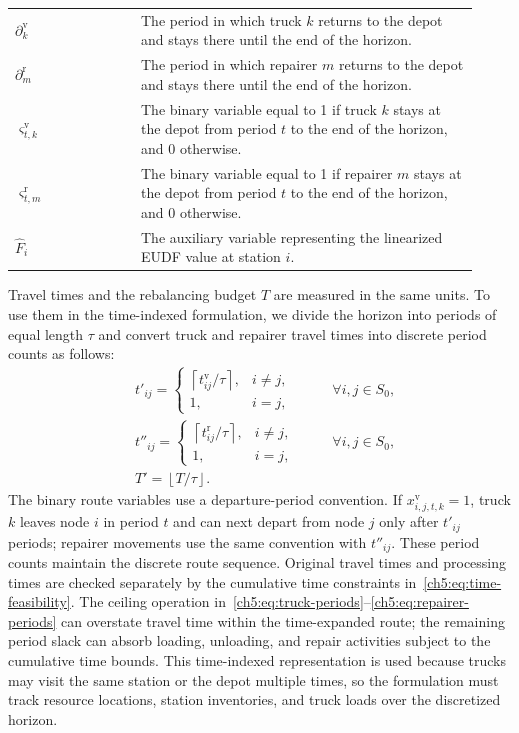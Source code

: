 \begin{longtable}{@{}L{0.25\linewidth}L{0.67\linewidth}@{}}
$\partial_k^{\mathrm{v}}$ & The period in which truck $k$ returns to the depot and stays there until the end of the horizon. \\
$\partial_m^{\mathrm{r}}$ & The period in which repairer $m$ returns to the depot and stays there until the end of the horizon. \\
$\varsigma_{t,k}^{\mathrm{v}}$ & The binary variable equal to 1 if truck $k$ stays at the depot from period $t$ to the end of the horizon, and 0 otherwise. \\
$\varsigma_{t,m}^{\mathrm{r}}$ & The binary variable equal to 1 if repairer $m$ stays at the depot from period $t$ to the end of the horizon, and 0 otherwise. \\
$\hat F_i$ & The auxiliary variable representing the linearized EUDF value at station $i$. \\
\end{longtable}

Travel times and the rebalancing budget $T$ are measured in the same units.
To use them in the time-indexed formulation, we divide the horizon into periods
of equal length $\tau$ and convert truck and repairer travel times into discrete
period counts as follows:
\begin{align}
&t'_{ij} =
\begin{cases}
\left\lceil t_{ij}^{\mathrm{v}}/\tau \right\rceil, & i\ne j,\\
1, & i=j,
\end{cases}
\quad &&\forall i,j\in S_0, \label{ch5:eq:truck-periods}\\
&t''_{ij} =
\begin{cases}
\left\lceil t_{ij}^{\mathrm{r}}/\tau \right\rceil, & i\ne j,\\
1, & i=j,
\end{cases}
\quad &&\forall i,j\in S_0, \label{ch5:eq:repairer-periods}\\
&T' = \left\lfloor T/\tau \right\rfloor. && \label{ch5:eq:num-periods}
\end{align}
The binary route variables use a departure-period convention. If
$x_{i,j,t,k}^{\mathrm{v}}=1$, truck $k$ leaves node $i$ in period $t$ and can
next depart from node $j$ only after $t'_{ij}$ periods; repairer movements use
the same convention with $t''_{ij}$. These period counts maintain the discrete
route sequence. Original travel times and processing times are checked
separately by the cumulative time constraints in~\eqref{ch5:eq:time-feasibility}.
The ceiling operation in~\eqref{ch5:eq:truck-periods}--\eqref{ch5:eq:repairer-periods}
can overstate travel time within the time-expanded route; the remaining period
slack can absorb loading, unloading, and repair activities subject to the
cumulative time bounds. This time-indexed representation is used because trucks
may visit the same station or the depot multiple times, so the formulation must
track resource locations, station inventories, and truck loads over the
discretized horizon.

